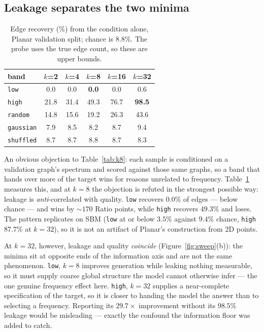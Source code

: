 \documentclass[11pt]{article}
\begin{document}
\subsection{Leakage separates the two minima}
\label{sec:leakage}

\begin{table}[t]
\centering\footnotesize
\setlength{\tabcolsep}{4pt}
\begin{tabular}{lccccc}
\toprule
band & $k${=}2 & $k${=}4 & $k${=}8 & $k${=}16 & $k${=}32 \\
\midrule
\texttt{low}      & 0.0 & 0.0 & \textbf{0.0} & 0.0 & 0.6 \\
\texttt{high}     & 21.8 & 31.4 & 49.3 & 76.7 & \textbf{98.5} \\
\texttt{random}   & 14.8 & 15.6 & 19.2 & 26.3 & 43.6 \\
\texttt{gaussian} & 7.9 & 8.5 & 8.2 & 8.7 & 9.4 \\
\texttt{shuffled} & 8.7 & 8.7 & 8.8 & 8.7 & 8.3 \\
\bottomrule
\end{tabular}
\caption{Edge recovery (\%) from the condition alone, Planar validation split; chance is 8.8\%.
The probe uses the true edge count, so these are upper bounds.}
\label{tab:leakage}
\end{table}

An obvious objection to Table~\ref{tab:k8}: each sample is conditioned on a validation graph's
spectrum and scored against those same graphs, so a band that hands over more of the target wins
for reasons unrelated to frequency. Table~\ref{tab:leakage} measures this, and at
$k{=}8$ the objection is refuted in the strongest possible way: leakage is \emph{anti}-correlated
with quality. \texttt{low} recovers $0.0\%$ of edges --- below chance --- and wins by ${\sim}170$
Ratio points, while \texttt{high} recovers $49.3\%$ and loses. The pattern replicates on SBM (\texttt{low} at or below $3.5\%$ against $9.4\%$ chance,
\texttt{high} $87.7\%$ at $k{=}32$), so it is not an artifact of Planar's construction from 2D
points.

At $k{=}32$, however, leakage and quality \emph{coincide} (Figure~\ref{fig:sweep}(b)): the minima
sit at opposite ends of the information axis and are not the same phenomenon. \texttt{low}, $k{=}8$ improves generation while leaking nothing measurable, so it must
supply coarse global structure the model cannot otherwise infer --- the one genuine frequency
effect here. \texttt{high}, $k{=}32$ supplies a near-complete specification of the target, so it
is closer to handing the model the answer than to selecting a frequency. Reporting its $29.7\times$ improvement without its $98.5\%$ leakage would be misleading ---
exactly the confound the information floor was added to catch.
\end{document}
